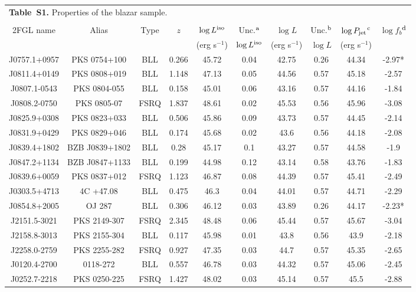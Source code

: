 \documentclass[12pt]{article}
\begin{document}
\begin{landscape}
\begin{longtable}{cccccccccc}
\multicolumn{10}{l}{{\bf Table~S1.} Properties of the blazar sample. } \\
\\
\hline\hline
2FGL name & Alias & Type & $z$ & $\log L^{\rm iso}$ & Unc.$^{\rm a}$ & $\log L$ & Unc.$^{\rm b}$ & $\log P_{\rm jet}$$^{\rm c}$ & $\log f_b$$^{\rm d}$ \\
 &  &  &  & (erg s$^{-1}$) & $\log L^{\rm iso}$ & (erg s$^{-1}$) & $\log L$ & (erg s$^{-1}$) & \\
 \hline
J0757.1+0957 & PKS 0754+100 & BLL & 0.266 & 45.72 & 0.04 & 42.75 & 0.26 & 44.34 & -2.97* \\
J0811.4+0149 & PKS 0808+019 & BLL & 1.148 & 47.13 & 0.05 & 44.56 & 0.57 & 45.18 & -2.57 \\
J0807.1-0543 & PKS 0804-055 & BLL & 0.158 & 45.01 & 0.06 & 43.16 & 0.57 & 44.16 & -1.84 \\
J0808.2-0750 & PKS 0805-07 & FSRQ & 1.837 & 48.61 & 0.02 & 45.53 & 0.56 & 45.96 & -3.08 \\
J0825.9+0308 & PKS 0823+033 & BLL & 0.506 & 45.86 & 0.09 & 43.73 & 0.57 & 44.45 & -2.14 \\
J0831.9+0429 & PKS 0829+046 & BLL & 0.174 & 45.68 & 0.02 & 43.6 & 0.56 & 44.18 & -2.08 \\
J0839.4+1802 & BZB J0839+1802 & BLL & 0.28 & 45.17 & 0.1 & 43.27 & 0.57 & 44.58 & -1.9 \\
J0847.2+1134 & BZB J0847+1133 & BLL & 0.199 & 44.98 & 0.12 & 43.14 & 0.58 & 43.76 & -1.83 \\
J0839.6+0059 & PKS 0837+012 & FSRQ & 1.123 & 46.87 & 0.08 & 44.39 & 0.57 & 45.41 & -2.49 \\
J0303.5+4713 & 4C +47.08 & BLL & 0.475 & 46.3 & 0.04 & 44.01 & 0.57 & 44.71 & -2.29 \\
J0854.8+2005 & OJ 287 & BLL & 0.306 & 46.12 & 0.03 & 43.89 & 0.26 & 44.17 & -2.23* \\
J2151.5-3021 & PKS 2149-307 & FSRQ & 2.345 & 48.48 & 0.06 & 45.44 & 0.57 & 45.67 & -3.04 \\
J2158.8-3013 & PKS 2155-304 & BLL & 0.117 & 45.98 & 0.01 & 43.8 & 0.56 & 43.9 & -2.18 \\
J2258.0-2759 & PKS 2255-282 & FSRQ & 0.927 & 47.35 & 0.03 & 44.7 & 0.57 & 45.35 & -2.65 \\
J0120.4-2700 & 0118-272 & BLL & 0.557 & 46.78 & 0.03 & 44.32 & 0.57 & 45.06 & -2.45 \\
J0252.7-2218 & PKS 0250-225 & FSRQ & 1.427 & 48.02 & 0.03 & 45.14 & 0.57 & 45.5 & -2.88 \\

\end{longtable}
\end{landscape}
\end{document}
